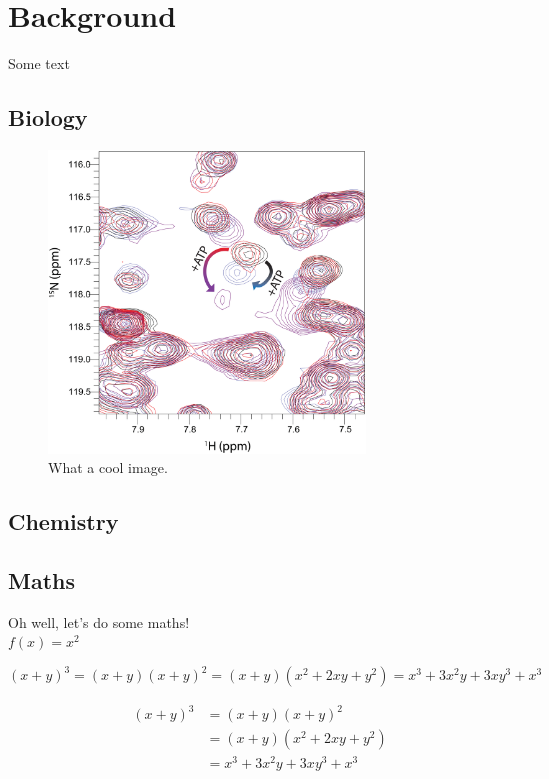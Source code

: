 \chapter{Background}
Some text

\section{Biology}

\begin{figure}[h]
    \centering
    \includegraphics[width=0.75\textwidth]{fig_01.png}
    \caption{What a cool image.}
    \label{fig:f01}
\end{figure}

\newpage
\section{Chemistry}

\newpage
\section{Maths}

Oh well, let's do some maths! \\

$f(x)=x^2$

\begin{equation}
		(x+y)^3 = (x+y)(x+y)^2
       		    =(x+y)(x^2+2xy+y^2)
                =x^3+3x^2y+3xy^3+x^3
\end{equation}

\begin{equation}
	\begin{split}
		(x+y)^3&=(x+y)(x+y)^2 \\
       		   &=(x+y)(x^2+2xy+y^2) \\
               &=x^3+3x^2y+3xy^3+x^3
	\end{split}
    \label{useful_name}
\end{equation}

